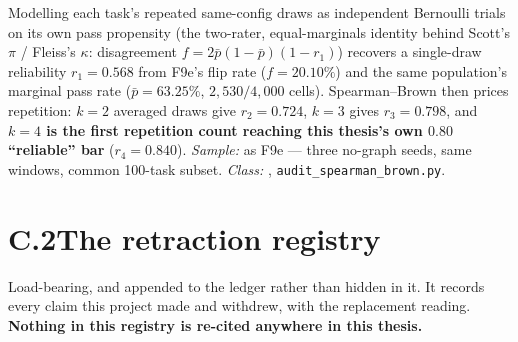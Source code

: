 \begin{description}[leftmargin=0pt,labelindent=0pt,labelsep=0pt,style=nextline,font=\normalfont,itemsep=6pt]
\item[\textbf{F60}\quad Spearman--Brown repetition price on the flip rate.]
Modelling each task's repeated same-config draws as independent Bernoulli
trials on its own pass propensity (the two-rater, equal-marginals identity
behind Scott's $\pi$ / Fleiss's $\kappa$: disagreement $f = 2\bar p(1-\bar
p)(1-r_1)$) recovers a single-draw reliability $r_1 = 0.568$ from F9e's
flip rate ($f=20.10\%$) and the same population's marginal pass rate
($\bar p = 63.25\%$, $2{,}530/4{,}000$ cells). Spearman--Brown then prices
repetition: $k{=}2$ averaged draws give $r_2=0.724$, $k{=}3$ gives
$r_3=0.798$, and \textbf{$k{=}4$ is the first repetition count reaching
this thesis's own $0.80$ ``reliable'' bar}  ($r_4=0.840$).
\emph{Sample:} as F9e --- three no-graph seeds, same windows, common
100-task subset. \emph{Class:} , \texttt{audit\_spearman\_brown.py}.

\end{description}

\section*{C.2\quad The retraction registry}

Load-bearing, and appended to the ledger rather than hidden in it. It
records every claim this project made and withdrew, with the replacement
reading. \textbf{Nothing in this registry is re-cited anywhere in this
thesis.}


